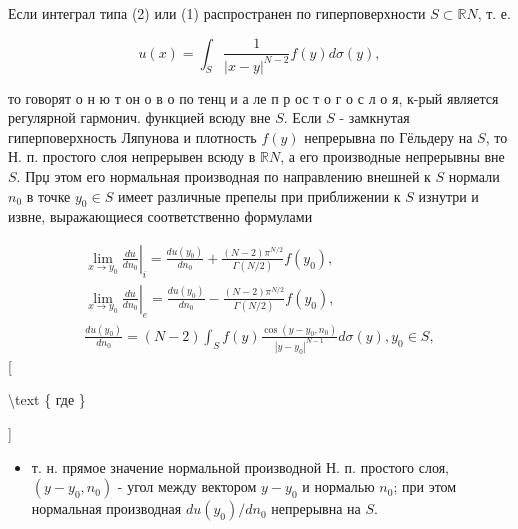 \documentclass[10pt]{article}
\begin{document}
Если интеграл типа (2) или (1) распространен по гиперповерхности $S \subset \mathbb{R} N$, т. е.



\[

u(x)=\int_{S} \frac{1}{|x-y|^{N-2}} f(y) d \sigma(y),

\]



то говорят о н ю т он о в о по тенц и а ле п р ос т о г о с л о я, к-рый является регулярной гармонич. функцией всюду вне $S$. Если $S$ - замкнутая гиперповерхность Ляпунова и плотность $f(y)$ непрерывна по Гёльдеру на $S$, то Н. п. простого слоя непрерывен всюду в $\mathbb{R} N$, а его производные непрерывны вне $S$. Прџ этом его нормальная производная по направлению внешней к $S$ нормали $n_{0}$ в точке $y_{0} \in S$ имеет различные препелы при приближении к $S$ изнутри и извне, выражающиеся соответственно формулами



\[

\begin{gathered}

\left.\lim _{x \rightarrow y_{0}} \frac{d u}{d n_{0}}\right|_{i}=\frac{d u\left(y_{0}\right)}{d n_{0}}+\frac{(N-2) \pi^{N / 2}}{\Gamma(N / 2)} f\left(y_{0}\right), \\

\left.\lim _{x \rightarrow y_{0}} \frac{d u}{d n_{0}}\right|_{e}=\frac{d u\left(y_{0}\right)}{d n_{0}}-\frac{(N-2) \pi^{N / 2}}{\Gamma(N / 2)} f\left(y_{0}\right), \\

\frac{d u\left(y_{0}\right)}{d n_{0}}=(N-2) \int_{S} f(y) \frac{\cos \left(y-y_{0}, n_{0}\right)}{\left|y-y_{0}\right|^{N-1}} d \sigma(y), y_{0} \in S,

\end{gathered}

\][



\textbackslash text \{ где \}

]



\begin{itemize}

  \item т. н. прямое значение нормальной производной Н. п. простого слоя, $\left(y-y_{0}, n_{0}\right)$ - угол между вектором $y-y_{0}$ и нормалью $n_{0}$; при этом нормальная производная $d u\left(y_{0}\right) / d n_{0}$ непрерывна на $S$.

\end{itemize}
\end{document}
